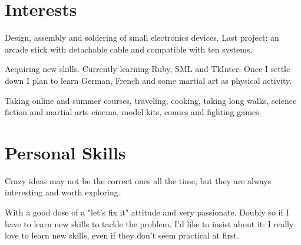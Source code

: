 \documentclass[11pt,a4paper,roman]{moderncv}
\begin{document}



\section{Interests}

	{Design, assembly and soldering of small electronics devices. Last project: an arcade stick with detachable cable and compatible with ten systems.}

	{Acquiring new skills. Currently learning Ruby, SML and TkInter.
	Once I settle down I plan to learn German, French and some martial art as physical activity.}


	{Taking online and summer courses, traveling, cooking, taking long walks, science fiction and martial arts cinema, model kits, comics and fighting games.}



\section{Personal Skills}

{Crazy ideas may not be the correct ones all the time, but they are always interesting and worth exploring.}

{With a good dose of a "let's fix it" attitude and very passionate. Doubly so if I have to learn new skills to tackle the problem. I'd like to insist about it: I really love to learn new skills, even if they don't seem practical at first.}
\end{document}
